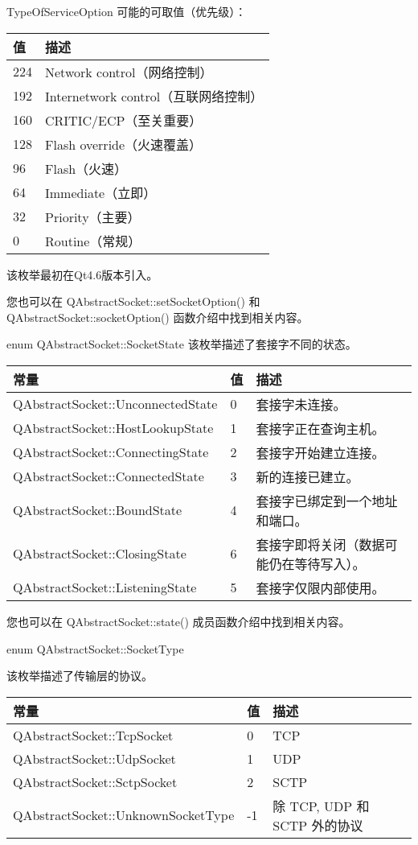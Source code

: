 TypeOfServiceOption 可能的可取值（优先级）：

\begin{tabular}{|l|l|}
\hline
值&	描述 \\
\hline
224&	Network control（网络控制）\\
\hline
192&	Internetwork control（互联网络控制）\\
\hline
160&	CRITIC/ECP（至关重要）\\
\hline
128&	Flash override（火速覆盖）\\
\hline
96&	Flash（火速）\\
\hline
64&	Immediate（立即）\\
\hline
32&	Priority（主要）\\
\hline
0&	Routine（常规） \\
\hline
\end{tabular}

该枚举最初在Qt4.6版本引入。

您也可以在 QAbstractSocket::setSocketOption() 和 QAbstractSocket::socketOption() 函数介绍中找到相关内容。

\splitLine

enum QAbstractSocket::SocketState
该枚举描述了套接字不同的状态。

\begin{tabular}{|l|l|l|}
\hline
常量&	值&	描述 \\ 
\hline
QAbstractSocket::UnconnectedState&	0&	套接字未连接。\\
\hline
QAbstractSocket::HostLookupState&	1&	套接字正在查询主机。\\
\hline
QAbstractSocket::ConnectingState&	2&	套接字开始建立连接。\\
\hline
QAbstractSocket::ConnectedState&	3&	新的连接已建立。\\
\hline
QAbstractSocket::BoundState&	4&	套接字已绑定到一个地址和端口。\\
\hline
QAbstractSocket::ClosingState&	6&	套接字即将关闭（数据可能仍在等待写入）。\\
\hline
QAbstractSocket::ListeningState&	5&	套接字仅限内部使用。\\
\hline
\end{tabular}

您也可以在 QAbstractSocket::state() 成员函数介绍中找到相关内容。

\splitLine

enum QAbstractSocket::SocketType

该枚举描述了传输层的协议。

\begin{tabular}{|l|l|l|}
\hline
常量&	值&	描述 \\ 
\hline
QAbstractSocket::TcpSocket&	0&	TCP \\ 
\hline
QAbstractSocket::UdpSocket&	1&	UDP\\ 
\hline
QAbstractSocket::SctpSocket&	2&	SCTP\\
\hline
QAbstractSocket::UnknownSocketType&	-1&	除 TCP, UDP 和 SCTP 外的协议\\
\hline
\end{tabular}

